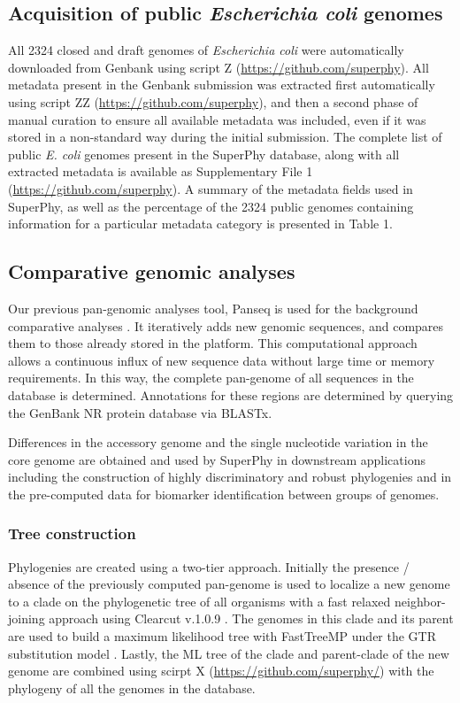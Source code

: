 \documentclass[doublespacing, linenumbers]{bmcart}
\begin{document}
\subsection{Acquisition of public \textit{Escherichia coli} genomes}
All 2324 closed and draft genomes of \textit{Escherichia coli} were automatically downloaded from Genbank using script Z (\url{https://github.com/superphy}). All metadata present in the Genbank submission was extracted first automatically using script ZZ (\url{https://github.com/superphy}), and then a second phase of manual curation to ensure all available metadata was included, even if it was stored in a non-standard way during the initial submission. The complete list of public \textit{E. coli} genomes present in the SuperPhy database, along with all extracted metadata is available as Supplementary File 1 (\url{https://github.com/superphy}). A summary of the metadata fields used in SuperPhy, as well as the percentage of the 2324 public genomes containing information for a particular metadata category is presented in Table 1.

\subsection{Comparative genomic analyses}
Our previous pan-genomic analyses tool, Panseq is used for the background comparative analyses \cite{laing_pan-genome_2010}. It iteratively adds new genomic sequences, and compares them to those already stored in the platform. This computational approach allows a continuous influx of new sequence data without large time or memory requirements. In this way, the complete pan-genome of all sequences in the database is determined. Annotations for these regions are determined by querying the GenBank NR protein database via BLASTx.

Differences in the accessory genome and the single nucleotide variation in the core genome are obtained and used by SuperPhy in downstream applications including the construction of highly discriminatory and robust phylogenies and in the pre-computed data for biomarker identification between groups of genomes.

\subsubsection{Tree construction}
Phylogenies are created using a two-tier approach. Initially the presence / absence of the previously computed pan-genome is used to localize a new genome to a clade on the phylogenetic tree of all organisms with a fast relaxed neighbor-joining approach using Clearcut v.1.0.9 \cite{sheneman_clearcut:_2006}. The genomes in this clade and its parent are used to build a maximum likelihood tree with FastTreeMP under the GTR substitution model \cite{price_fasttree_2010}. Lastly, the ML tree of the clade and parent-clade of the new genome are combined using scirpt X (\url{https://github.com/superphy/}) with the phylogeny of all the genomes in the database.
\end{document}
